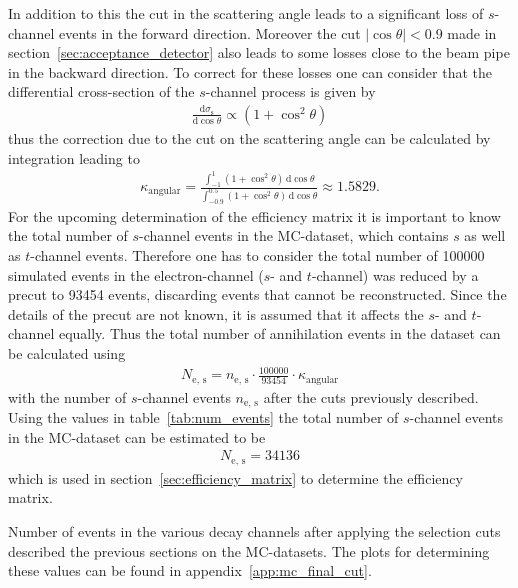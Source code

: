\documentclass[11pt, a4paper]{article}
\numberwithin{equation}{section}
\newcommand\dinf[1]{ \,\mathrm{d}#1 }
\newcommand\deriv[2] { \frac{\mathrm{d} #1}{\mathrm{d} #2} }
\begin{document}
In addition to this the cut in the scattering angle leads to a significant loss of $s$-channel events in the forward direction.
Moreover the cut $\left| \cos\theta \right| < 0.9$ made in section~\ref{sec:acceptance_detector} also leads to some losses close to the beam pipe in the backward direction.
To correct for these losses one can consider that the differential cross-section of the $s$-channel process is given by
\begin{align*}
	\deriv{\sigma_\mathrm{s}}{\cos\theta} \propto \left( 1 + \cos^2\theta \right)
\end{align*}
thus the correction due to the cut on the scattering angle can be calculated by integration leading to
\begin{align*}
\kappa_\mathrm{angular} = \frac{\int_{-1}^{1}(1 + \cos^2\theta) \dinf{\cos\theta}}{\int_{-0.9}^{0.5}(1 + \cos^2\theta) \dinf{\cos\theta}} \approx 1.5829 \text{.}
\end{align*}
For the upcoming determination of the efficiency matrix it is important to know the total number of $s$-channel events in the MC-dataset, which contains $s$ as well as $t$-channel events.
Therefore one has to consider the total number of \num{100000} simulated events in the electron-channel ($s$- and $t$-channel) was reduced by a precut to \num{93454} events, discarding events that cannot be reconstructed.
Since the details of the precut are not known, it is assumed that it affects the $s$- and $t$-channel equally.
Thus the total number of annihilation events in the dataset can be calculated using
\begin{align*}
	N_\mathrm{e,\,s} = n_\mathrm{e,\,s} \cdot \frac{100000}{93454} \cdot \kappa_\mathrm{angular}
\end{align*}
with the number of $s$-channel events $n_\mathrm{e,\,s}$ after the cuts previously described.
Using the values in table~\ref{tab:num_events} the total number of $s$-channel events in the MC-dataset can be estimated to be
\begin{align*}
	N_\mathrm{e,\,s} = 34136
\end{align*}
which is used in section~\ref{sec:efficiency_matrix} to determine the efficiency matrix.

\begin{table}[h]
	\centering
	
	\caption{Number of events in the various decay channels after applying the selection cuts described the previous sections on the MC-datasets. The plots for determining these values can be found in appendix~\ref{app:mc_final_cut}.}
	\label{tab:num_events}
\end{table}
\end{document}
